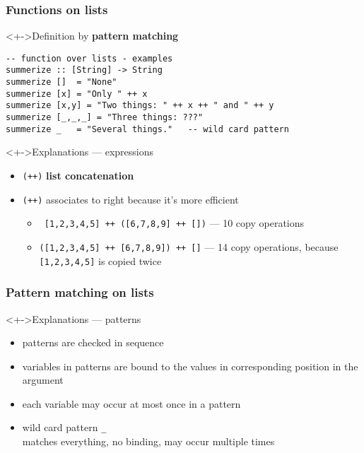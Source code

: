 \documentclass{beamer}
\begin{document}
\begin{frame}[fragile]
  \frametitle{Functions on lists}
  \begin{block}<+->{Definition by \textbf{pattern matching}}
\begin{verbatim}
-- function over lists - examples
summerize :: [String] -> String
summerize []  = "None"
summerize [x] = "Only " ++ x
summerize [x,y] = "Two things: " ++ x ++ " and " ++ y
summerize [_,_,_] = "Three things: ???"
summerize _   = "Several things."   -- wild card pattern
\end{verbatim}
  \end{block}
  \begin{alertblock}<+->{Explanations --- expressions}
    \begin{itemize}
    \item  \texttt{(++)} \textbf{list concatenation}
    \item  \texttt{(++)} associates to right because it's more efficient
      \begin{itemize}
      \item \texttt{ [1,2,3,4,5] ++ ([6,7,8,9] ++ [])} --- 10 copy
        operations
      \item 
        \texttt{([1,2,3,4,5] ++ [6,7,8,9]) ++ []} --- 14 copy operations,
        because \texttt{[1,2,3,4,5]} is copied twice
      \end{itemize}
    \end{itemize}
  \end{alertblock}
\end{frame}
\begin{frame}[fragile]
  \frametitle{Pattern matching on lists}
  \begin{alertblock}<+->{Explanations --- patterns}
    \small
    \begin{itemize}
    \item  patterns are checked in sequence
    \item  variables in patterns are bound to the values in
      corresponding position in the argument
    \item  each variable may occur at most once in a pattern
    \item wild card pattern \verb!_!\\ matches everything, no binding, may occur multiple times
    \end{itemize}
  \end{alertblock}
\end{frame}
\end{document}
